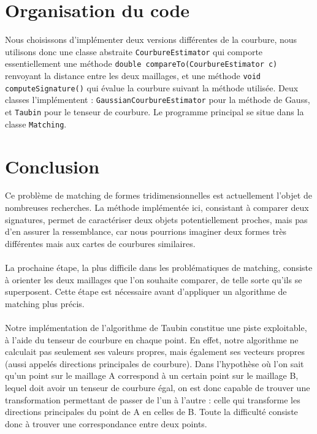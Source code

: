 \documentclass{llncs}
\begin{document}
\section{Organisation du code}

Nous choisissons d'implémenter deux versions différentes de la courbure, nous utilisons donc une classe abstraite \texttt{CourbureEstimator} qui comporte essentiellement une méthode \texttt{double compareTo(CourbureEstimator c)} renvoyant la distance entre les deux maillages, et une méthode \texttt{void computeSignature()} qui évalue la courbure suivant la méthode utilisée. Deux classes l'implémentent : \texttt{GaussianCourbureEstimator} pour la méthode de Gauss, et \texttt{Taubin} pour le tenseur de courbure. Le programme principal se situe dans la classe \texttt{Matching}.

\section{Conclusion}

Ce problème de matching de formes tridimensionnelles est actuellement l'objet de nombreuses recherches. La méthode implémentée ici, consistant à comparer deux signatures, permet de caractériser deux objets potentiellement proches, mais pas d'en assurer la ressemblance, car nous pourrions imaginer deux formes très différentes mais aux cartes de courbures similaires.
\\\\
La prochaine étape, la plus difficile dans les problématiques de matching, consiste à orienter les deux maillages que l'on souhaite comparer, de telle sorte qu'ils se superposent. Cette étape est nécessaire avant d’appliquer un algorithme de matching plus précis.
\\\\
Notre implémentation de l’algorithme de Taubin constitue une piste exploitable, à l’aide du tenseur de courbure en chaque point. En effet, notre algorithme ne calculait pas seulement ses valeurs propres, mais également ses vecteurs propres (aussi appelés directions principales de courbure). Dans l’hypothèse où l’on sait qu’un point sur le maillage A correspond à un certain point sur le maillage B, lequel doit avoir un tenseur de courbure égal, on est donc capable de trouver une transformation permettant de passer de l’un à l’autre : celle qui transforme les directions principales du point de A en celles de B. Toute la difficulté consiste donc à trouver une correspondance entre deux points.



\end{document}

